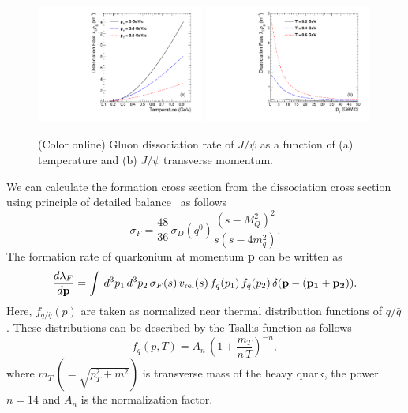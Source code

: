 \documentclass[12pt,a4paper,final]{iopart} %
\newcommand{\Jpsi}{J/\psi}
\begin{document}
\begin{figure}
\includegraphics[width=0.49\textwidth]{Fig2a_DRateVsT.pdf}
\includegraphics[width=0.49\textwidth]{Fig2b_DRateVsPt.pdf}
\caption{(Color online) Gluon dissociation rate of $\Jpsi$ as a function of (a) temperature and  
(b) $\Jpsi$ transverse momentum.}
\label{fig:DRateVsTempAndPt}
\end{figure}




We can calculate the formation cross section from the dissociation cross section
using principle of detailed balance~\cite{Thews:2000rj,Thews:2005vj} as follows
\begin{equation}
\sigma_{F} = \frac{48}{36}\,\sigma_{D}(q^0)\frac{(s-M_{Q}^2)^{2}}{s(s-4m_q^{2})}.
\end{equation}
The formation rate of quarkonium at momentum {\bf p} can be written as
\begin{equation}
\frac{d\lambda_{F}}{d{\rm\bf p}} = \int \,d^{3}p_1 \,d^{3}p_2 \,\sigma_{F}(s)\, v_{\rm rel}(s)\,f_{q}(p_1)\, f_{\bar{q}} (p_2)\,\delta({\rm\bf p}-( {\rm\bf p_1} + {\rm\bf p_2} )).
\end{equation}
Here, $f_{q/\bar{q}}(p)$ are taken as normalized near thermal distribution functions
of $q/\bar{q}$. These distributions can be described by the Tsallis
function as follows 
\begin{equation}
f_{q} (p,T) = A_{n}\,\left( 1+\frac{m_{T}}{n \,T} \right)^{-n},
\end{equation}
where $m_T\,(=\sqrt{p_{T}^{2}+m^{2}})$ is transverse mass of the heavy quark, the
power $n=14$ and $A_n$ is the normalization factor.
\end{document}
